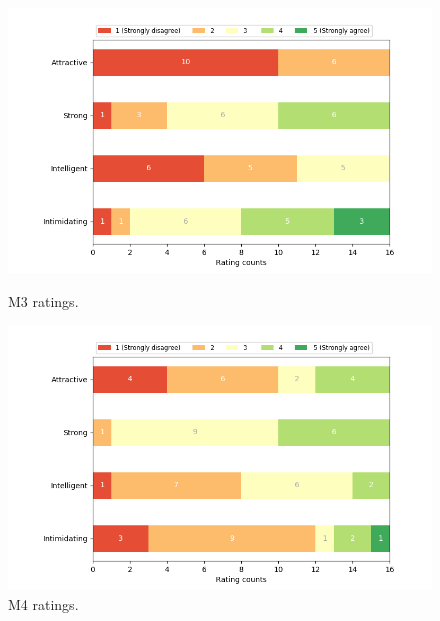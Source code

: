 \begin{figure}[H]
  \includegraphics[width=\linewidth]{Survey/MRatings/avatar_m3.png}
  \caption{M3 ratings.}
\endminipage\hfill
{}
  \includegraphics[width=\linewidth]{Survey/MRatings/avatar_m4.png}
  \caption{M4 ratings.}
\endminipage\hfill
\end{figure}
